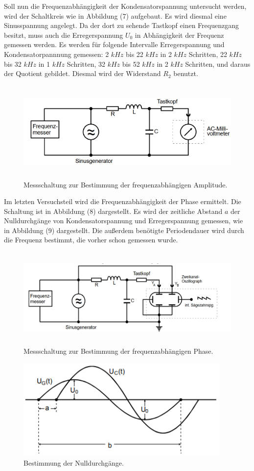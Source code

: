 \noindent Soll nun die Frequenzabhängigkeit der Kondensatorspannung untersucht werden, wird der Schaltkreis wie in Abbildung (7) aufgebaut.
Es wird diesmal eine Sinusspannung angelegt. Da der dort zu sehende Tastkopf einen Frequenzgang besitzt, muss auch die Erregerspannung $U_0$ in Abhängigkeit der Frequenz gemessen werden.
Es werden für folgende Intervalle Erregerspannung und Kondensatorpannnung gemessen: 2 $kHz$ bis 22 $kHz$ in 2 $kHz$ Schritten, 22 $kHz$ bis 32 $kHz$ in 1 $kHz$ Schritten,
32 $kHz$ bis 52 $kHz$ in 2 $kHz$ Schritten, und daraus der Quotient gebildet. Diesmal wird der Widerstand  $R_2$ benutzt.
\begin{figure}[H]
  \centering
  \includegraphics[height=5cm]{Schaltung3.png}
  \caption{Messschaltung zur Bestimmung der frequenzabhängigen Amplitude. \cite[S. 13]{kent}}
\end{figure}


\noindent Im letzten Versuchsteil wird die Frequenzabhängigkeit der Phase ermittelt. Die Schaltung ist in Abbildung (8) dargestellt.
Es wird der zeitliche Abstand $a$ der Nulldurchgänge von Kondensatorspannung und Erregerspannung gemessen, wie in Abbildung (9) dargestellt.
Die außerdem benötigte Periodendauer wird durch die Frequenz bestimmt, die vorher schon gemessen wurde.
\begin{figure}[H]
  \centering
  \includegraphics[height=5cm]{Schaltung4.png}
  \caption{Messschaltung zur Bestimmung der frequenzabhängigen Phase. \cite[S. 13]{kent}}
\end{figure}
\begin{figure}[H]
  \centering
  \includegraphics[height=5cm]{phi.png}
  \caption{Bestimmung der Nulldurchgänge. \cite[S. 7]{l}}
\end{figure}

